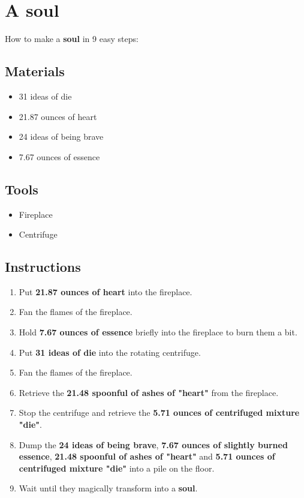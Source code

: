 \documentclass{article}
\begin{document}
\section{A soul}How to make a \textbf{soul} in 9 easy steps:

\subsection{Materials}\begin{itemize}
\item 
31 ideas of die
\item 
21.87 ounces of heart
\item 
24 ideas of being brave
\item 
7.67 ounces of essence
\end{itemize}
\subsection{Tools}\begin{itemize}
\item 
Fireplace
\item 
Centrifuge
\end{itemize}
\subsection{Instructions}\begin{enumerate}
\item 
Put \textbf{21.87 ounces of heart} into the fireplace.
\item 
Fan the flames of the fireplace.
\item 
Hold \textbf{7.67 ounces of essence} briefly into the fireplace to burn them a bit.
\item 
Put \textbf{31 ideas of die} into the rotating centrifuge.
\item 
Fan the flames of the fireplace.
\item 
Retrieve the \textbf{21.48 spoonful of ashes of "heart"} from the fireplace.
\item 
Stop the centrifuge and retrieve the \textbf{5.71 ounces of centrifuged mixture "die"}.
\item 
Dump the \textbf{24 ideas of being brave}, \textbf{7.67 ounces of slightly burned essence}, \textbf{21.48 spoonful of ashes of "heart"} and \textbf{5.71 ounces of centrifuged mixture "die"} into a pile on the floor.
\item 
Wait until they magically transform into a \textbf{soul}.
\end{enumerate}
\newpage
\end{document}
